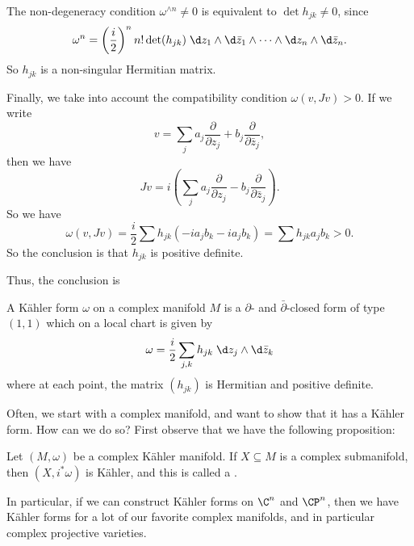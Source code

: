 \documentclass[a4paper]{article}
\begin{document}
The non-degeneracy condition $\omega^{\wedge n} \not= 0$ is equivalent to $\det h_{jk} \not= 0$, since
\[
  \omega^n = \left(\frac{i}{2}\right)^n n! \det(h_{jk}) \;\d z_1 \wedge \d \bar{z}_1 \wedge \cdots \wedge \d z_n \wedge \d \bar{z}_n.
\]
So $h_{jk}$ is a non-singular Hermitian matrix.

Finally, we take into account the compatibility condition $\omega(v, Jv) > 0$. If we write
\[
  v = \sum_j a_j \frac{\partial}{\partial z_j} + b_j \frac{\partial}{\partial \bar{z}_j},
\]
then we have
\[
  Jv = i \left(\sum_j a_j \frac{\partial}{\partial z_j} - b_j \frac{\partial}{\partial \bar{z}_j}\right).
\]
So we have
\[
  \omega(v, Jv) = \frac{i}{2} \sum h_{jk} (-ia_j b_k - ia_j b_k) = \sum h_{jk} a_j b_k > 0.
\]
So the conclusion is that $h_{jk}$ is positive definite.

Thus, the conclusion is
\begin{thm}
  A K\"ahler form $\omega$ on a complex manifold $M$ is a $\partial$- and $\bar{\partial}$-closed form of type $(1, 1)$ which on a local chart is given by
  \[
    \omega = \frac{i}{2} \sum_{j, k} h_{jk} \;\d z_j \wedge \d \bar{z}_k
  \]
  where at each point, the matrix $(h_{jk})$ is Hermitian and positive definite.
\end{thm}

Often, we start with a complex manifold, and want to show that it has a K\"ahler form. How can we do so? First observe that we have the following proposition:
\begin{prop}
  Let $(M, \omega)$ be a complex K\"ahler manifold. If $X \subseteq M$ is a complex submanifold, then $(X, i^* \omega)$ is K\"ahler, and this is called a .\fakeqed
\end{prop}

In particular, if we can construct K\"ahler forms on $\C^n$ and $\CP^n$, then we have K\"ahler forms for a lot of our favorite complex manifolds, and in particular complex projective varieties.
\end{document}
